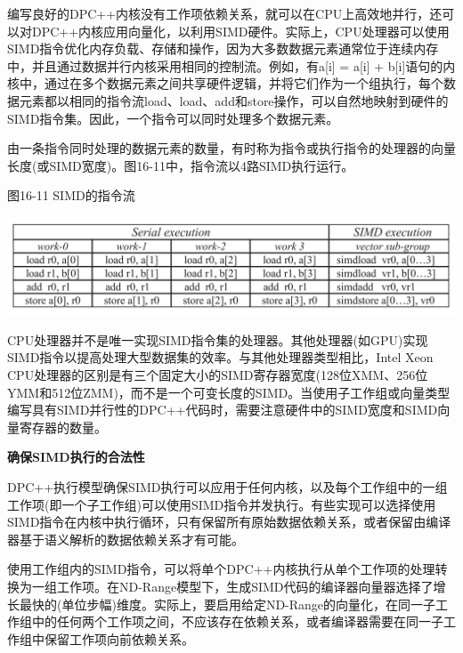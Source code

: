 编写良好的DPC++内核没有工作项依赖关系，就可以在CPU上高效地并行，还可以对DPC++内核应用向量化，以利用SIMD硬件。实际上，CPU处理器可以使用SIMD指令优化内存负载、存储和操作，因为大多数数据元素通常位于连续内存中，并且通过数据并行内核采用相同的控制流。例如，有a[i] = a[i] + b[i]语句的内核中，通过在多个数据元素之间共享硬件逻辑，并将它们作为一个组执行，每个数据元素都以相同的指令流load、load、add和store操作，可以自然地映射到硬件的SIMD指令集。因此，一个指令可以同时处理多个数据元素。\par

由一条指令同时处理的数据元素的数量，有时称为指令或执行指令的处理器的向量长度(或SIMD宽度)。图16-11中，指令流以4路SIMD执行运行。\par

\hspace*{\fill} \par %
图16-11 SIMD的指令流
\begin{center}
	\includegraphics[width=1.0\textwidth]{content/chapter-16/images/10}
\end{center}

CPU处理器并不是唯一实现SIMD指令集的处理器。其他处理器(如GPU)实现SIMD指令以提高处理大型数据集的效率。与其他处理器类型相比，Intel Xeon CPU处理器的区别是有三个固定大小的SIMD寄存器宽度(128位XMM、256位YMM和512位ZMM)，而不是一个可变长度的SIMD。当使用子工作组或向量类型编写具有SIMD并行性的DPC++代码时，需要注意硬件中的SIMD宽度和SIMD向量寄存器的数量。\par

\hspace*{\fill} \par %
\textbf{确保SIMD执行的合法性}

DPC++执行模型确保SIMD执行可以应用于任何内核，以及每个工作组中的一组工作项(即一个子工作组)可以使用SIMD指令并发执行。有些实现可以选择使用SIMD指令在内核中执行循环，只有保留所有原始数据依赖关系，或者保留由编译器基于语义解析的数据依赖关系才有可能。\par

使用工作组内的SIMD指令，可以将单个DPC++内核执行从单个工作项的处理转换为一组工作项。在ND-Range模型下，生成SIMD代码的编译器向量器选择了增长最快的(单位步幅)维度。实际上，要启用给定ND-Range的向量化，在同一子工作组中的任何两个工作项之间，不应该存在依赖关系，或者编译器需要在同一子工作组中保留工作项向前依赖关系。\par

